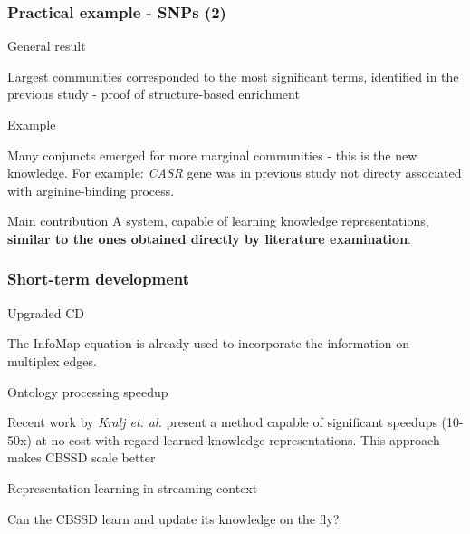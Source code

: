 \documentclass{beamer}
\begin{document}
  \begin{frame}\frametitle{Practical example - SNPs (2)}

    \begin{block}{General result}

      Largest communities corresponded to the most significant terms, identified in the previous study - proof of structure-based enrichment
      
    \end{block}

        \begin{exampleblock}{Example}

          Many conjuncts emerged for more marginal communities - this is the new knowledge.
          For example: \textit{CASR} gene was in previous study not directy associated with arginine-binding process.
      
        \end{exampleblock}

        \begin{block}{Main contribution}
          A system, capable of learning knowledge representations, \textbf{similar to the ones obtained directly by literature examination}.
        \end{block}
       
      \end{frame}

      \begin{frame}\frametitle{Short-term development}

        \begin{block}{Upgraded CD}

          The InfoMap equation is already used to incorporate the information on multiplex edges.         
        \end{block}

        \begin{block}{Ontology processing speedup}

          Recent work by \textit{Kralj et. al.} present a method capable of significant speedups (10-50x) at no cost with regard learned knowledge representations. This approach makes CBSSD scale better
        \end{block}

        \begin{block}{Representation learning in streaming context}

          Can the CBSSD learn and update its knowledge on the fly? 
          
          \end{block}
        
      \end{frame}
\end{document}
